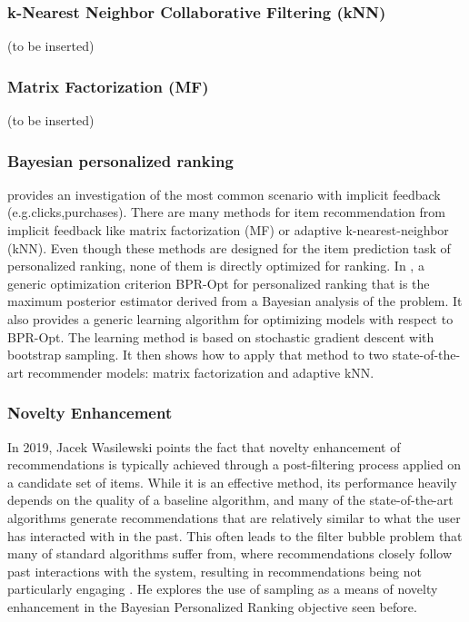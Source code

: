 \documentclass[12pt]{article}
\begin{document}
\subsubsection{k-Nearest  Neighbor  Collaborative Filtering (kNN)} 
(to be inserted)
\subsubsection{Matrix Factorization (MF)}
(to be inserted)
\subsubsection{Bayesian personalized ranking}
 \cite{Rendle2009} provides an investigation of the most common scenario  with  implicit  feedback  (e.g.clicks,purchases). There  are  many  methods  for item recommendation from implicit feedback like matrix factorization (MF) or adaptive k-nearest-neighbor  (kNN). Even  though  these methods  are  designed  for  the  item  prediction  task  of  personalized  ranking,  none  of them  is  directly  optimized  for  ranking. In \cite{Rendle2009}, a generic optimization criterion BPR-Opt for personalized ranking that is the maximum posterior estimator derived  from  a  Bayesian  analysis  of  the  problem. It also provides  a  generic  learning  algorithm  for  optimizing  models  with  respect to BPR-Opt.  The learning method is based on stochastic gradient descent with bootstrap sampling. It then shows how to apply that method to two state-of-the-art recommender models: matrix factorization and adaptive kNN.

\subsubsection{Novelty Enhancement}
In 2019, Jacek Wasilewski points the fact that novelty enhancement of recommendations is typically achieved through a post-filtering process applied on a candidate set of items. While it is an effective method, its performance heavily depends on the quality of a baseline algorithm, and many of the state-of-the-art algorithms generate recommendations that are relatively similar to what the user has interacted with in the past. This often leads to the filter bubble problem that many of standard algorithms suffer from, where recommendations closely follow past interactions with the system, resulting in recommendations being not particularly engaging \cite{Wasilewski2019}. He explores the use of sampling as a means of novelty enhancement in the Bayesian Personalized Ranking objective seen before.\\\\
\end{document}
